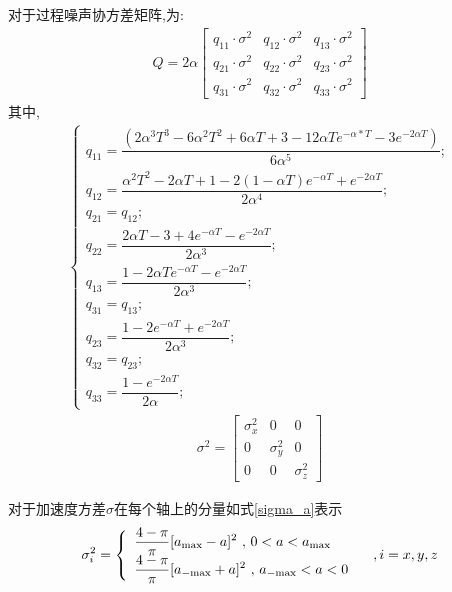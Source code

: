 \documentclass[12pt]{article}
\numberwithin{equation}{section} %
\begin{document}
对于过程噪声协方差矩阵,为:
\begin{align}
    Q = 2 \alpha
    \begin{bmatrix}
     q_{11}\cdot \sigma^2 & q_{12} \cdot \sigma^2& q_{13}\cdot \sigma^2\\
     q_{21}\cdot \sigma^2 & q_{22}\cdot \sigma^2 & q_{23}\cdot \sigma^2\\
     q_{31}\cdot \sigma^2 & q_{32}\cdot \sigma^2 & q_{33}\cdot \sigma^2
    \end{bmatrix} 
\end{align}
其中,
\begin{align}
    \left \{
    \begin{array}{lll}
    q_{11} = \dfrac{(2\alpha^3T^3-6\alpha^2T^2+6\alpha T+3-12\alpha T e^{-\alpha*T}-3e^{-2\alpha T})}{6\alpha^5};\\
    q_{12} = \dfrac{\alpha^2T^2-2\alpha T+1-2 (1-\alpha T) e^{-\alpha T}+ e^{-2\alpha T}}{2\alpha^4};\\
    q_{21} = q_{12};\\
    q_{22} = \dfrac{2\alpha T-3+4 e^{-\alpha T}-e^{-2\alpha T}}{2\alpha^3};\\
    q_{13} = \dfrac{1-2\alpha T e^{-\alpha T}-e^{-2\alpha T}}{2\alpha^3};\\
    q_{31} = q_{13};\\
    q_{23} = \dfrac{1-2e^{-\alpha T}+e^{-2\alpha T}}{2\alpha^3};\\
    q_{32} = q_{23};\\
    q_{33} = \dfrac{1-e^{-2\alpha T}}{2\alpha};
\end{array}
\right.
\end{align}
\begin{align}
    \sigma ^2 = 
    \begin{bmatrix}
     \sigma_x ^2 & 0 & 0\\
     0 & \sigma_y ^2 & 0\\
     0 & 0 & \sigma_z ^2
\end{bmatrix}
\end{align}

对于加速度方差$\sigma$在每个轴上的分量如式\eqref{sigma_a}表示
\begin{align}
    \sigma_{i}^{2}=\left\{\begin{array}{l l}{{\displaystyle\frac{4-\pi}{\pi}[a_{\mathrm{max}}-a]^{2}\mathrm{~,~}0<a<a_{\mathrm{max}}}}\\ {{\displaystyle\frac{4-\pi}{\pi}[a_{\mathrm{-max}}+a]^{2}\mathrm{~,~}a_{\mathrm{-max}}<a<0}}\end{array}\right. 
    \quad ,i = x, y,z \label{sigma_a}
\end{align}
\end{document}
